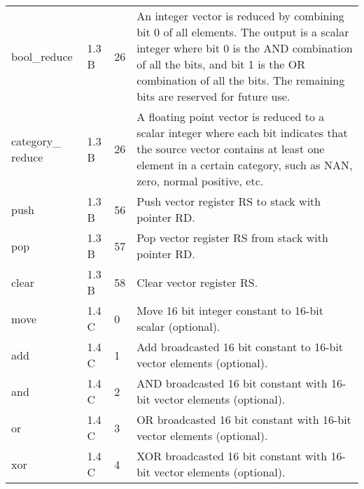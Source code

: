 \documentclass[forwardcom.tex]{subfiles}
\begin{document}
\begin{longtable} {|p{25mm}|p{14mm}|p{10mm}|p{95mm}|}
bool\_reduce  & 1.3 B & 26 & An integer vector is reduced by combining bit 0 of all elements. The output is a scalar integer where bit 0 is the
AND combination of all the bits, and bit 1 is the OR combination of
all the bits. The remaining bits are reserved for future use. \\

category\_ reduce & 1.3 B & 26 & A floating point vector is reduced to a scalar integer where each bit indicates that the source vector contains at least one element in a certain category, such as NAN, zero, normal positive, etc. \\

push          & 1.3 B & 56  & Push vector register RS to stack with pointer RD. \\
pop           & 1.3 B & 57  & Pop vector register RS from stack with pointer RD. \\
clear         & 1.3 B & 58  & Clear vector register RS. \\

move          & 1.4 C &  0 & Move 16 bit integer constant to 16-bit scalar (optional). \\
add           & 1.4 C &  1 & Add broadcasted 16 bit constant to 16-bit vector elements (optional). \\
and           & 1.4 C &  2 & AND broadcasted 16 bit constant with 16-bit vector elements (optional). \\
or            & 1.4 C &  3 & OR broadcasted 16 bit constant with 16-bit vector elements (optional). \\
xor           & 1.4 C &  4 & XOR broadcasted 16 bit constant with 16-bit vector elements (optional). \\


\end{longtable}
\end{document}
